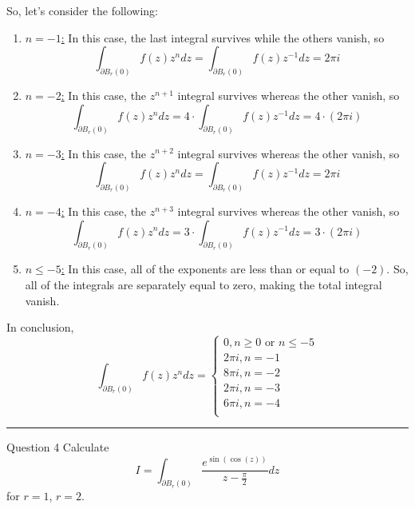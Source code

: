 \documentclass{article}
\begin{document}
\vskip 0.5cm
So, let's consider the following:

\begin{enumerate}[label=(\alph*)]
  \item \underline{$n = -1$:} In this case, the last integral survives while the others vanish, so 
  \[ \int_{\partial B_r(0)} f(z) z^n dz =  \int_{\partial B_r(0)} f(z) z^{-1} dz = 2\pi i \]

  \item \underline{$n = -2$:} In this case, the $z^{n+1}$ integral survives whereas the other vanish, so
  \[ \int_{\partial B_r(0)} f(z) z^n dz = 4 \cdot \int_{\partial B_r(0)} f(z) z^{-1} dz = 4 \cdot (2\pi i) \]

  \item \underline{$n = -3$:} In this case, the $z^{n+2}$ integral survives whereas the other vanish, so
  \[ \int_{\partial B_r(0)} f(z) z^n dz =  \int_{\partial B_r(0)} f(z) z^{-1} dz = 2\pi i \]

  \item \underline{$n = -4$:} In this case, the $z^{n+3}$ integral survives whereas the other vanish, so
  \[ \int_{\partial B_r(0)} f(z) z^n dz = 3 \cdot \int_{\partial B_r(0)} f(z) z^{-1} dz = 3 \cdot (2\pi i) \]

  \item \underline{$n \leq -5$:} In this case, all of the exponents are less than or equal to $(-2)$. So, all of the integrals are separately equal to zero, making the total integral vanish.
\end{enumerate}

In conclusion, 
\[ \boxed{ \int_{\partial B_r(0)} f(z) z^n dz = \begin{cases}
  0, n \geq 0 \text{ or } n \leq -5 \\
  2\pi i, n = -1 \\
  8\pi i, n = -2 \\
  2\pi i, n = -3 \\
  6\pi i, n = -4 \\
\end{cases} } \]

\vskip 0.5cm
\hrule 
\vskip 0.5cm




\begin{mathdefinitionbox}{Question 4}
\vskip 0.5cm
Calculate 
\[ I = \int_{\partial B_r(0)} \frac{e^{\sin(\cos(z))}}{z - \frac{\pi}{2}} dz \]
for $r = 1$, $r = 2$.
\end{mathdefinitionbox}
\end{document}
